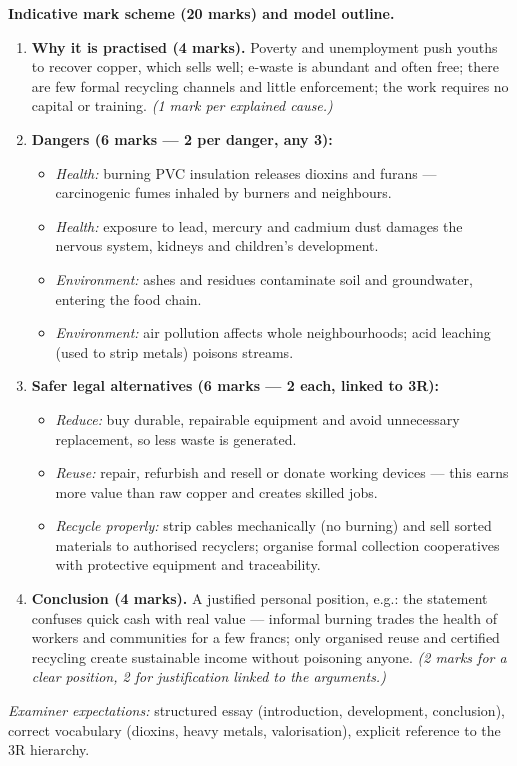 \documentclass[11pt]{article}
\begin{document}
\begin{corrige}
\textbf{Indicative mark scheme (20 marks) and model outline.}
\begin{enumerate}
\item \textbf{Why it is practised (4 marks).} Poverty and unemployment push youths to recover copper, which sells well; e-waste is abundant and often free; there are few formal recycling channels and little enforcement; the work requires no capital or training. \emph{(1 mark per explained cause.)}
\item \textbf{Dangers (6 marks --- 2 per danger, any 3):}
\begin{itemize}
\item \emph{Health:} burning PVC insulation releases dioxins and furans --- carcinogenic fumes inhaled by burners and neighbours.
\item \emph{Health:} exposure to lead, mercury and cadmium dust damages the nervous system, kidneys and children's development.
\item \emph{Environment:} ashes and residues contaminate soil and groundwater, entering the food chain.
\item \emph{Environment:} air pollution affects whole neighbourhoods; acid leaching (used to strip metals) poisons streams.
\end{itemize}
\item \textbf{Safer legal alternatives (6 marks --- 2 each, linked to 3R):}
\begin{itemize}
\item \emph{Reduce:} buy durable, repairable equipment and avoid unnecessary replacement, so less waste is generated.
\item \emph{Reuse:} repair, refurbish and resell or donate working devices --- this earns more value than raw copper and creates skilled jobs.
\item \emph{Recycle properly:} strip cables mechanically (no burning) and sell sorted materials to authorised recyclers; organise formal collection cooperatives with protective equipment and traceability.
\end{itemize}
\item \textbf{Conclusion (4 marks).} A justified personal position, e.g.: the statement confuses quick cash with real value --- informal burning trades the health of workers and communities for a few francs; only organised reuse and certified recycling create sustainable income without poisoning anyone. \emph{(2 marks for a clear position, 2 for justification linked to the arguments.)}
\end{enumerate}
\emph{Examiner expectations:} structured essay (introduction, development, conclusion), correct vocabulary (dioxins, heavy metals, valorisation), explicit reference to the 3R hierarchy.
\end{corrige}
\end{document}
